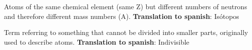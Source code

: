 \begin{vocabulary}[Isotopes]
      Atoms of the same chemical element (same Z) but different numbers of neutrons and therefore different mass numbers (A). \newline
       \textbf{Translation to spanish}: Isótopos \newline
\end{vocabulary}

\begin{vocabulary}[Indivisible]
      Term referring to something that cannot be divided into smaller parts, originally used to describe atoms. \newline
       \textbf{Translation to spanish}: Indivisible \newline
\end{vocabulary}


